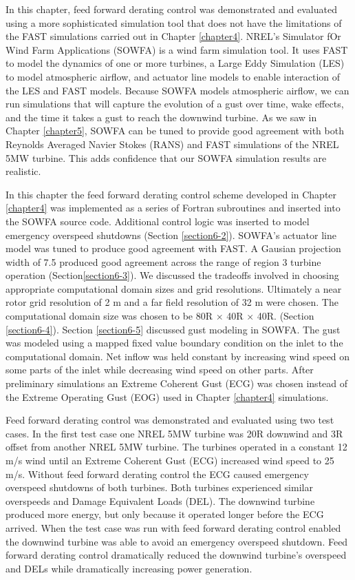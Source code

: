 In this chapter, feed forward derating control was demonstrated and evaluated using a more sophisticated simulation tool that does not have the limitations of the FAST simulations carried out in Chapter \ref{chapter4}. NREL's Simulator fOr Wind Farm Applications (SOWFA) is a wind farm simulation tool. It uses FAST to model the dynamics of one or more turbines, a Large Eddy Simulation (LES) to model atmospheric airflow, and actuator line models to enable interaction of the LES and FAST models. Because SOWFA models atmospheric airflow, we can run simulations that will capture the evolution of a gust over time, wake effects, and the time it takes a gust to reach the downwind turbine. As we saw in Chapter \ref{chapter5}, SOWFA can be tuned to provide good agreement with both Reynolds Averaged Navier Stokes (RANS) and FAST simulations of the NREL 5MW turbine. This adds confidence that our SOWFA simulation results are realistic.

In this chapter the feed forward derating control scheme developed in Chapter \ref{chapter4} was implemented as a series of Fortran subroutines and inserted into the SOWFA source code. Additional control logic was inserted to model emergency overspeed shutdowns (Section \ref{section6-2}). SOWFA's actuator line model was tuned to produce good agreement with FAST. A Gausian projection width of 7.5 produced good agreement across the range of region 3 turbine operation (Section\ref{section6-3}). We discussed the tradeoffs involved in choosing appropriate computational domain sizes and grid resolutions. Ultimately a near rotor grid resolution of 2 m and a far field resolution of 32 m were chosen. The computational domain size was chosen to be 80R $\times$ 40R $\times$ 40R. (Section \ref{section6-4}). Section \ref{section6-5} discussed gust modeling in SOWFA. The gust was modeled using a mapped fixed value boundary condition on the inlet to the computational domain. Net inflow was held constant by increasing wind speed on some parts of the inlet while decreasing wind speed on other parts. After preliminary simulations an Extreme Coherent Gust (ECG) was chosen instead of the Extreme Operating Gust (EOG) used in Chapter \ref{chapter4} simulations.

Feed forward derating control was demonstrated and evaluated using two test cases. In the first test case one NREL 5MW turbine was 20R downwind and 3R offset from another NREL 5MW turbine. The turbines operated in a constant 12 m/s wind until an Extreme Coherent Gust (ECG) increased wind speed to 25 m/s. Without feed forward derating control the ECG caused emergency overspeed shutdowns of both turbines. Both turbines experienced similar overspeeds and Damage Equivalent Loads (DEL). The downwind turbine produced more energy, but only because it operated longer before the ECG arrived. When the test case was run with feed forward derating control enabled the downwind turbine was able to avoid an emergency overspeed shutdown. Feed forward derating control dramatically reduced the downwind turbine's overspeed and DELs while dramatically increasing power generation.

